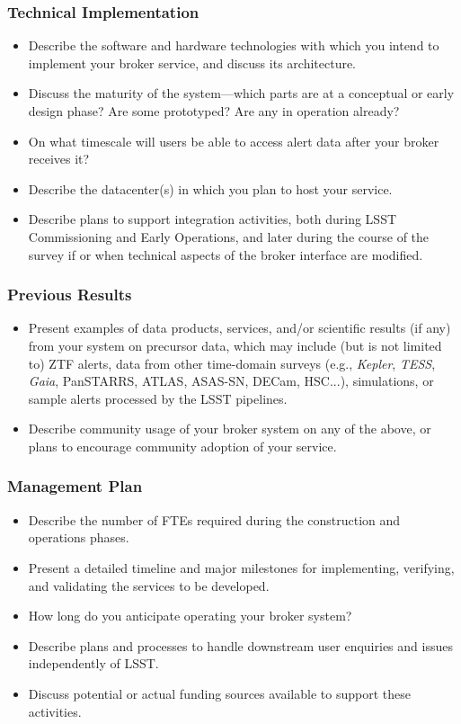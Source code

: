 \documentclass[DM,toc,lsstdraft]{lsstdoc}
\begin{document}
\subsubsection{Technical Implementation}

\begin{itemize}
\item Describe the software and hardware technologies with which you intend to implement your broker service, and discuss its architecture.
\item Discuss the maturity of the system---which parts are at a conceptual or early design phase?  Are some prototyped? Are any in operation already?
\item On what timescale will users be able to access alert data after your broker receives it?
\item Describe the datacenter(s) in which you plan to host your service.
\item Describe plans to support integration activities,  both during LSST Commissioning and Early Operations,  and later during the course of the survey if or when technical aspects of the broker interface are modified.
\end{itemize}


\subsubsection{Previous Results}

\begin{itemize}
\item Present examples of data products, services, and/or scientific results (if any) from your system on precursor data, which may include (but is not limited to) ZTF alerts, data from other time-domain surveys (e.g., \textit{Kepler}, \textit{TESS}, \textit{Gaia}, PanSTARRS, ATLAS, ASAS-SN, DECam, HSC...), simulations, or sample alerts processed by the LSST pipelines.
\item Describe community usage of your broker system on any of the above, or plans to encourage community adoption of your service.
\end{itemize}
	
\subsubsection{Management Plan}

\begin{itemize}
\item Describe the number of FTEs required during the construction and operations phases.
\item Present a detailed timeline and major milestones for implementing, verifying, and validating the services to be developed.
\item How long do you anticipate operating your broker system?
\item Describe plans and processes to handle downstream user enquiries and issues independently of LSST.
\item Discuss potential or actual funding sources available to support these activities.	
\end{itemize}
\end{document}
